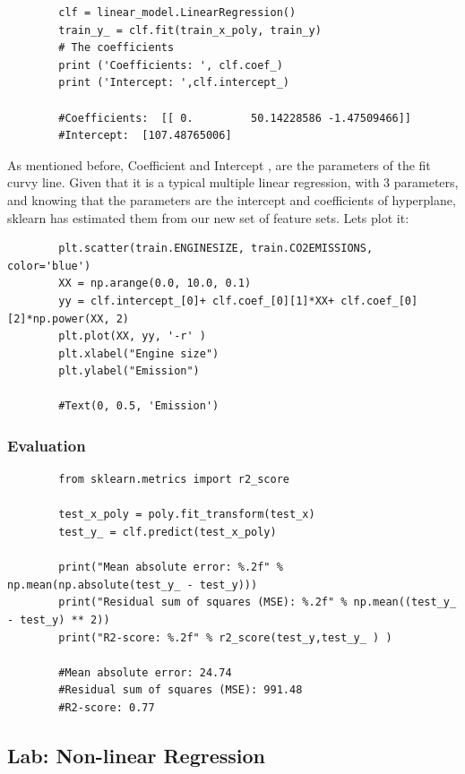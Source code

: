 	\begin{verbatim}
		clf = linear_model.LinearRegression()
		train_y_ = clf.fit(train_x_poly, train_y)
		# The coefficients
		print ('Coefficients: ', clf.coef_)
		print ('Intercept: ',clf.intercept_)
		
		#Coefficients:  [[ 0.         50.14228586 -1.47509466]]
		#Intercept:  [107.48765006]
	\end{verbatim}

	As mentioned before, Coefficient and Intercept , are the parameters of the fit curvy line. Given that it is a typical multiple linear regression, with 3 parameters, and knowing that the parameters are the intercept and coefficients of hyperplane, sklearn has estimated them from our new set of feature sets. Lets plot it:
	
	\begin{verbatim}
		plt.scatter(train.ENGINESIZE, train.CO2EMISSIONS,  color='blue')
		XX = np.arange(0.0, 10.0, 0.1)
		yy = clf.intercept_[0]+ clf.coef_[0][1]*XX+ clf.coef_[0][2]*np.power(XX, 2)
		plt.plot(XX, yy, '-r' )
		plt.xlabel("Engine size")
		plt.ylabel("Emission")
		
		#Text(0, 0.5, 'Emission')
	\end{verbatim}

	\subsubsection{Evaluation}
	
	\begin{verbatim}
		from sklearn.metrics import r2_score
		
		test_x_poly = poly.fit_transform(test_x)
		test_y_ = clf.predict(test_x_poly)
		
		print("Mean absolute error: %.2f" % np.mean(np.absolute(test_y_ - test_y)))
		print("Residual sum of squares (MSE): %.2f" % np.mean((test_y_ - test_y) ** 2))
		print("R2-score: %.2f" % r2_score(test_y,test_y_ ) )
		
		#Mean absolute error: 24.74
		#Residual sum of squares (MSE): 991.48
		#R2-score: 0.77		
	\end{verbatim}
	
	
	\subsection{Lab: Non-linear Regression}